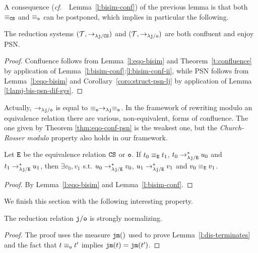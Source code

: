 \documentclass{LMCS}
\newcommand{\cf}{{\it  cf.}~}
\renewcommand{\>}{\rightarrow}
\def\lam{\lambda}
\newcommand{\Rew}[1]{\rightarrow_{#1}}
\newcommand{\Rewn}[2][*]{\rightarrow^{#1}_{#2}}
\newcommand{\ttE}{{\tt E}}
\newcommand{\dis}{{\tt j}}
\newcommand{\ldis}{\lam{\dis}}
\newcommand{\CS}{{\tt CS}}
\newcommand{\terms}{\mathcal{T}}
\newcommand{\dm}[1]{\dis {\tt m}(#1)}
\newcommand{\modulo}[2]{#1/#2}
\newcommand{\eqo}{\equiv_\osym}
\newcommand{\eqttE}{\equiv_{\ttE}}
\newcommand{\osym}{{\tt o}}
\newcommand{\ldiso}{\ldis/{\osym}}
\newcommand{\ldisttE}{\ldis/{\ttE}}
\newcommand{\osymb}{{\tt o}}
\newcommand{\eqcs}{\equiv_\CS}
\begin{document}
\noindent A consequence (\cf\ Lemma~\ref{l:bisim-conf}) of the previous lemma is that
both $\eqcs$ and  $\eqo$ can be postponed, which implies in particular the following.

\begin{thm}
\label{thm:eqo-conf-psn}
The reduction systems $(\terms, \Rew{\ldis/\CS})$ 
and $(\terms, \Rew{\ldiso})$ are both confluent and enjoy PSN.
\end{thm}



\begin{proof}
Confluence follows from Lemma~\ref{l:eqo-bisim} and
Theorem~\ref{t:confluence} by application of
Lemma~\ref{l:bisim-conf}:\ref{l:bisim-conf-ii}, while PSN follows from
Lemma~\ref{l:eqo-bisim} and Corollary~\ref{coro:struct-psn-lj} by
application of Lemma \ref{l:lamj-bis-psn-dif-sys}.
\end{proof}


Actually, $\Rew{\ldiso}$ is equal to $\eqo\Rew{\ldis}\eqo$. In
  the framework of rewriting modulo an equivalence relation there are
  various, non-equivalent, forms of confluence. The one given by Theorem \ref{thm:eqo-conf-psn} is
  the weakest one, but the 
  \textit{Church-Rosser modulo} property also holds in our framework. 

\begin{thm}[Church-Rosser modulo $\CS$ and $\osymb$]
\label{cr-modulo}
Let $\ttE$ be the equivalence relation $\CS$ or $\osymb$. 
If $t_0 \eqttE t_1$, $t_0 \Rewn{\ldisttE} u_0$ and
$t_1 \Rewn{\ldisttE} u_1$, then $\exists v_0, v_1$ s.t.
$u_0 \Rewn{\ldisttE} v_0$, $u_1 \Rewn{\ldisttE} v_1$
and $ v_0 \eqttE v_1$.
\end{thm} 


\begin{proof}
By  Lemma~\ref{l:eqo-bisim} and Lemma~\ref{l:bisim-conf}. 
\end{proof}

We finish this section with the following interesting property.

\begin{lem}
\label{l:dis-o}
The reduction relation $\modulo{\dis}{\osym}$ is strongly normalizing.
\end{lem}

\begin{proof} The proof uses the measure $\dm{}$ used to prove
Lemma~\ref{l:dis-terminates} and the fact that 
$t \equiv_{\osym} t'$ implies $\dm{t} = \dm{t'}$.
\end{proof}
\end{document}
